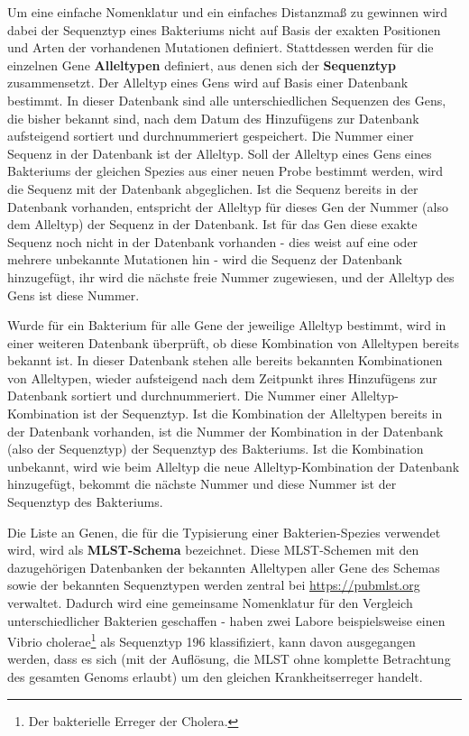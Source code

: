 Um eine einfache Nomenklatur und ein einfaches Distanzmaß zu gewinnen wird dabei der Sequenztyp eines Bakteriums nicht auf Basis der exakten Positionen und Arten der vorhandenen Mutationen definiert. Stattdessen werden für die einzelnen Gene \textbf{Alleltypen} definiert, aus denen sich der \textbf{Sequenztyp} zusammensetzt. Der Alleltyp eines Gens wird auf Basis einer Datenbank bestimmt. In dieser Datenbank sind alle unterschiedlichen Sequenzen des Gens, die bisher bekannt sind, nach dem Datum des Hinzufügens zur Datenbank aufsteigend sortiert und durchnummeriert gespeichert. Die Nummer einer Sequenz in der Datenbank ist der Alleltyp. Soll der Alleltyp eines Gens eines Bakteriums der gleichen Spezies aus einer neuen Probe bestimmt werden, wird die Sequenz mit der Datenbank abgeglichen. Ist die Sequenz bereits in der Datenbank vorhanden, entspricht der Alleltyp für dieses Gen der Nummer (also dem Alleltyp) der Sequenz in der Datenbank. Ist für das Gen diese exakte Sequenz noch nicht in der Datenbank vorhanden - dies weist auf eine oder mehrere unbekannte Mutationen hin - wird die Sequenz der Datenbank hinzugefügt, ihr wird die nächste freie Nummer zugewiesen, und der Alleltyp des Gens ist diese Nummer.

Wurde für ein Bakterium für alle Gene der jeweilige Alleltyp bestimmt, wird in einer weiteren Datenbank überprüft, ob diese Kombination von Alleltypen bereits bekannt ist. In dieser Datenbank stehen alle bereits bekannten Kombinationen von Alleltypen, wieder aufsteigend nach dem Zeitpunkt ihres Hinzufügens zur Datenbank sortiert und durchnummeriert. Die Nummer einer Alleltyp-Kombination ist der Sequenztyp. Ist die Kombination der Alleltypen bereits in der Datenbank vorhanden, ist die Nummer der Kombination in der Datenbank (also der Sequenztyp) der Sequenztyp des Bakteriums. Ist die Kombination unbekannt, wird wie beim Alleltyp die neue Alleltyp-Kombination der Datenbank hinzugefügt, bekommt die nächste Nummer und diese Nummer ist der Sequenztyp des Bakteriums.

Die Liste an Genen, die für die Typisierung einer Bakterien-Spezies verwendet wird, wird als \textbf{MLST-Schema} bezeichnet. Diese MLST-Schemen mit den dazugehörigen Datenbanken der bekannten Alleltypen aller Gene des Schemas sowie der bekannten Sequenztypen werden zentral bei \href{https://pubmlst.org/}{https://pubmlst.org} verwaltet. Dadurch wird eine gemeinsame Nomenklatur für den Vergleich unterschiedlicher Bakterien geschaffen - haben zwei Labore beispielsweise einen Vibrio cholerae\footnote{Der bakterielle Erreger der Cholera.} als Sequenztyp 196 klassifiziert, kann davon ausgegangen werden, dass es sich (mit der Auflösung, die MLST ohne komplette Betrachtung des gesamten Genoms erlaubt) um den gleichen Krankheitserreger handelt. 

